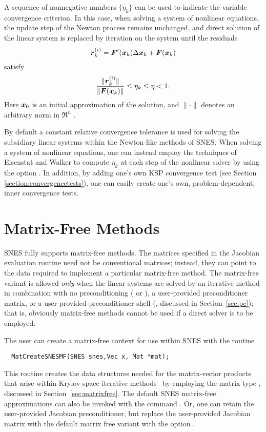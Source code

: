 A sequence of nonnegative numbers $ \{\eta_k\} $ can be used to 
indicate the variable convergence criterion.
In this case, when solving a system of nonlinear equations, the 
update step of the Newton process remains unchanged, and direct 
solution of the linear system is replaced by iteration on the 
system until the residuals
\[  \mbox{\boldmath \(r\)}_k^{(i)} =  \mbox{\boldmath \(F\)}'(\mbox{\boldmath \(x\)}_k) \Delta \mbox{\boldmath \(x\)}_k + \mbox{\boldmath \(F\)}(\mbox{\boldmath \(x\)}_k) \]
satisfy
\[  \frac{ \| \mbox{\boldmath \(r\)}_k^{(i)} \| }{ \| \mbox{\boldmath \(F\)}(\mbox{\boldmath \(x\)}_k) \| } \leq \eta_k \leq \eta < 1. \]
Here $ \mbox{\boldmath \(x\)}_0 $ is an initial approximation of the solution, and
$ \| \cdot \| $ denotes an arbitrary norm in $ \Re^n $ .  

By default a constant relative convergence tolerance is used for
solving the subsidiary linear systems within the Newton-like methods
of SNES.  When solving a system of nonlinear equations, one can
instead employ the techniques of Eisenstat and Walker \cite{ew94}
to compute $ \eta_k $ at each step of the nonlinear solver by using the
option  . In addition,
by adding one's own KSP convergence test (see Section 
\ref{section:convergencetests}), one can easily create one's own,
problem-dependent, inner convergence tests. 

\section{Matrix-Free Methods}
\label{sec:nlmatrixfree}

SNES fully supports matrix-free methods. The matrices specified in the
Jacobian evaluation routine need not be conventional
matrices; instead, they can point to the data required to implement a
particular matrix-free method.  The matrix-free variant is allowed
{\em only} when the linear systems are solved by an iterative method
in combination with no preconditioning ( or ),
a user-provided preconditioner matrix, or a user-provided preconditioner
shell (, discussed in Section~\ref{sec:pc}); that is,
obviously matrix-free methods cannot be used if a direct solver is to 
be employed.  

The user can create a matrix-free context for use within SNES with 
the routine
\begin{verbatim}
  MatCreateSNESMF(SNES snes,Vec x, Mat *mat);
\end{verbatim}
This routine creates the data structures needed for the matrix-vector 
products that arise within Krylov space iterative methods~\cite{brownsaad:90}
by employing the matrix type , 
discussed in Section~\ref{sec:matrixfree}.  The default SNES matrix-free
approximations can also be invoked with the command . 
Or, one can retain the user-provided Jacobian preconditioner, but replace the 
user-provided Jacobian matrix with the default matrix free variant with the
option . 


